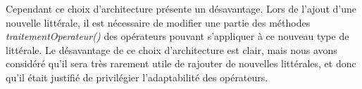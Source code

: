 \medskip
Cependant ce choix d'architecture présente un désavantage. Lors de l'ajout d'une nouvelle littérale, il est nécessaire de modifier une partie des méthodes \textit{traitementOperateur()} des opérateurs pouvant s'appliquer à ce nouveau type de littérale. 
Le désavantage de ce choix d'architecture est clair, mais nous avons considéré qu'il sera très rarement utile de rajouter de nouvelles littérales, et donc qu'il était justifié de privilégier l'adaptabilité des opérateurs.






